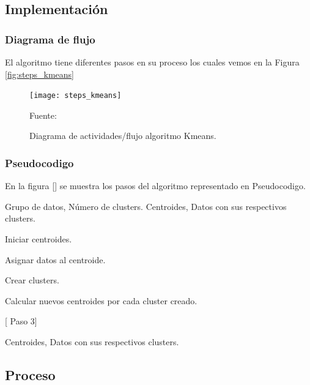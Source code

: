 \subsection{Implementación}

\subsubsection{Diagrama de flujo}

El algoritmo tiene diferentes pasos en su proceso los cuales vemos en la Figura \ref{fig:steps_kmeans}

\begin{figure}[ht]
	\begin{center}
		\texttt{[image: steps\_kmeans]}
	\end{center}
	\begin{center}
		\vskip -0.5cm
		\caption{\small{Diagrama de actividades/flujo algoritmo Kmeans.}}
		{\small{Fuente: }}
	\end{center}
\end{figure}

\subsubsection{Pseudocodigo}
En la figura [] se muestra los pasos del algoritmo representado en Pseudocodigo.

\begin{algorithm}
\begin{algorithmic}[1]
		\REQUIRE Grupo de datos, Número de clusters.  %
		\label{lin:algorithm_kmeans}
		\ENSURE Centroides, Datos con sus respectivos clusters.                                                       %
		
		\STATE Iniciar centroides.
					
		\STATE Asignar datos al centroide. \label{marker}
			
		\STATE Crear clusters.
			
		\STATE Calcular nuevos centroides por cada cluster creado.
			
			 [ Paso 3]
		\ENDIF
			
		\RETURN  Centroides, Datos con sus respectivos clusters.
		
\end{algorithmic}
\end{algorithm}


\subsection{Proceso}

